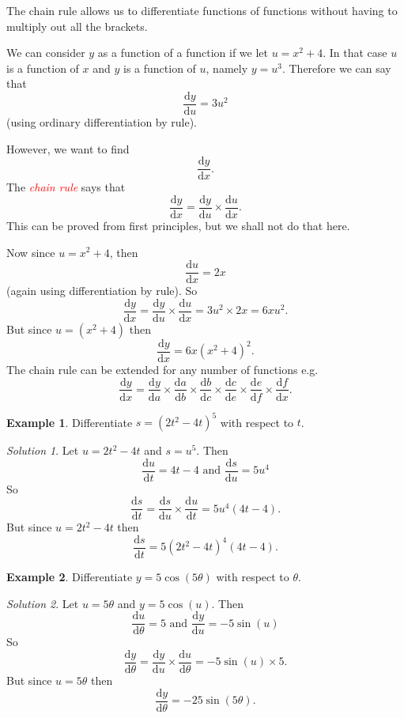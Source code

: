 \documentclass[
  11pt,
  oneside]{book}
\newcommand{\slide}{}
\theoremstyle{definition}
\theoremstyle{definition}
\newtheorem{example}{Example}[chapter]
\theoremstyle{definition}
\theoremstyle{definition}
\theoremstyle{remark}
\newtheorem*{solution}{Solution}
\begin{document}
The chain rule allows us to differentiate functions of functions without having to multiply out all the brackets.

We can consider \(y\) as a function of a function if we let \(u = x^2 + 4\). In that case \(u\) is a function of \(x\) and \(y\) is a function of \(u\), namely \(y = u^3\). Therefore we can say that
\[
\frac{\mathrm{d} y}{\mathrm{d} u} = 3u^2
\]
(using ordinary differentiation by rule).

However, we want to find
\[
\frac{\mathrm{d} y}{\mathrm{d} x}.
\]
The \textcolor{red}{\em chain rule} says that
\[
\frac{\mathrm{d} y}{\mathrm{d} x} = \frac{\mathrm{d} y}{\mathrm{d} u}\times \frac{\mathrm{d} u}{\mathrm{d} x}.
\]
This can be proved from first principles, but we shall not do that here.

Now since \(u = x^2 + 4\), then
\[
\frac{\mathrm{d} u}{\mathrm{d} x} = 2x
\]
(again using differentiation by rule).
So
\[
\frac{\mathrm{d} y}{\mathrm{d} x} = \frac{\mathrm{d} y}{\mathrm{d} u}\times \frac{\mathrm{d} u}{\mathrm{d} x} = 3u^2\times 2x = 6xu^2.
\]
But since \(u = (x^2+4)\) then
\[
\frac{\mathrm{d} y}{\mathrm{d} x} = 6x(x^2 +4)^2.
\]
The chain rule can be extended for any number of functions e.g.
\[
\frac{\mathrm{d} y}{\mathrm{d} x} = \frac{\mathrm{d} y}{\mathrm{d} a}\times \frac{\mathrm{d} a}{\mathrm{d} b}\times \frac{\mathrm{d} b}{\mathrm{d} c}\times \frac{\mathrm{d} c}{\mathrm{d} e}\times\frac{\mathrm{d} e}{\mathrm{d} f}\times\frac{\mathrm{d} f}{\mathrm{d} x}.
\]
\slide

\begin{example}
Differentiate \(s = (2t^2- 4t)^5\) with respect to \(t\).
\end{example}

\begin{solution}
Let \(u = 2t^2-4t\) and \(s = u^5\). Then
\[
\frac{\mathrm{d} u}{\mathrm{d} t} = 4t-4\text{ and }\frac{\mathrm{d} s}{\mathrm{d} u} = 5u^4
\]
So
\[
\frac{\mathrm{d} s}{\mathrm{d} t} = \frac{\mathrm{d} s}{\mathrm{d} u}\times\frac{\mathrm{d} u}{\mathrm{d} t} = 5u^4(4t-4).
\]
But since \(u = 2t^2-4t\) then
\[
\frac{\mathrm{d} s}{\mathrm{d} t} = 5(2t^2-4t)^4(4t-4).
\]
\end{solution}

\slide

\begin{example}
Differentiate \(y=5\cos(5\theta)\) with respect to \(\theta\).
\end{example}

\begin{solution}
Let \(u = 5\theta\) and \(y = 5\cos(u)\). Then
\[
\frac{\mathrm{d} u}{{\mathrm{d} \theta}} = 5\text{ and }\frac{\mathrm{d} y}{\mathrm{d} u} = -5\sin(u)
\]
So
\[
\frac{\mathrm{d} y}{{\mathrm{d} \theta}} = \frac{\mathrm{d} y}{\mathrm{d} u}\times\frac{\mathrm{d} u}{{\mathrm{d} \theta}} = -5\sin(u)\times5.
\]
But since \(u = 5\theta\) then
\[
\frac{\mathrm{d} y}{{\mathrm{d} \theta}} = -25\sin(5\theta).
\]
\end{solution}
\end{document}
